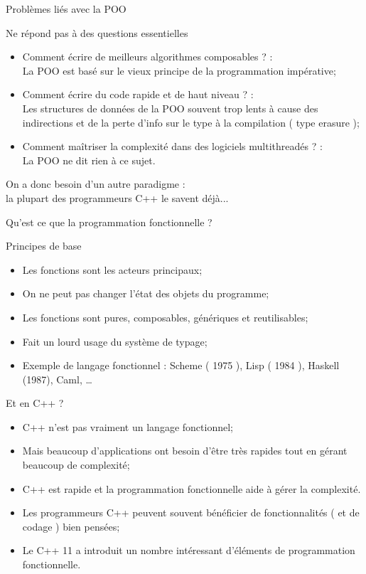 \documentclass[handout,10pt]{beamer}
\begin{document}
\begin{frame}[fragile]{Problèmes liés avec la POO}
\begin{block}{Ne répond pas à des questions essentielles}
\begin{itemize}
 \item {\color{DarkGreen}Comment écrire de meilleurs algorithmes composables ?} :\\ La POO est basé sur le vieux principe
 de la programmation impérative;
 \item {\color{DarkGreen}Comment écrire du code rapide et de haut niveau ?} :\\ Les structures de données de la POO souvent
 trop lents à cause des indirections et de la perte d'info sur le type à la compilation ( type erasure );
 \item {\color{DarkGreen}Comment maîtriser la complexité dans des logiciels multithreadés ?} :\\ La POO ne dit rien à ce sujet. 
\end{itemize}
\alert{On a donc besoin d'un autre paradigme} :\\ la plupart des programmeurs C++ le savent déjà...
\end{block}
\end{frame}

\begin{frame}[fragile]{Qu'est ce que la programmation fonctionnelle ?}
\tiny
\begin{exampleblock}{Principes de base}
\begin{itemize}
\item Les fonctions sont les acteurs principaux;
\item On ne peut pas changer l'état des objets du programme;
\item Les fonctions sont pures, composables, génériques et reutilisables;
\item Fait un lourd usage du système de typage;
\item Exemple de langage fonctionnel : {\color{blue}Scheme ( 1975 ), Lisp ( 1984 ), Haskell (1987), Caml, \ldots}
\end{itemize}
\end{exampleblock}

\begin{block}{Et en C++ ?}
\begin{itemize}
 \item C++ n'est pas vraiment un langage fonctionnel;
 \item Mais beaucoup d'applications ont besoin d'être très rapides tout en gérant beaucoup de complexité;
 \item C++ est rapide et la programmation fonctionnelle aide à gérer la complexité.
 \item Les programmeurs C++ peuvent souvent bénéficier de fonctionnalités ( et de codage ) bien pensées;
 \item Le C++ 11 a introduit un nombre intéressant d'éléments de programmation fonctionnelle.
\end{itemize}
\end{block}

\end{frame}
\end{document}
